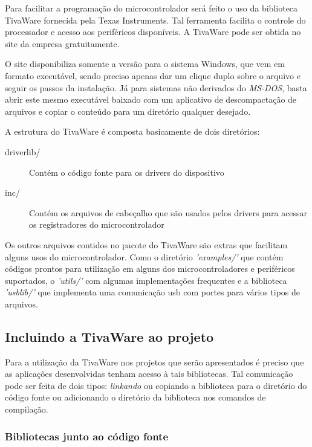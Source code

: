 Para facilitar a programação do microcontrolador será feito o uso da biblioteca TivaWare fornecida pela Texas Instruments. Tal ferramenta facilita o controle do processador e acesso aos periféricos disponíveis. A TivaWare pode ser obtida no site da empresa gratuitamente.

O site disponibiliza somente a versão para o sistema Windows, que vem em formato executável, sendo preciso apenas dar um clique duplo sobre o arquivo e seguir os passos da instalação. Já para sistemas não derivados do \emph{MS-DOS}, basta abrir este mesmo executável baixado com um aplicativo de descompactação de arquivos e copiar o conteúdo para um diretório qualquer desejado.

A estrutura do TivaWare é composta basicamente de dois diretórios:

\begin{description}
	\item [driverlib/] Contém o código fonte para os drivers do dispositivo
	\item [inc/] Contém os arquivos de cabeçalho que são usados pelos drivers para acessar os registradores do microcontrolador
\end{description}

Os outros arquivos contidos no pacote do TivaWare são extras que facilitam alguns usos do microcontrolador. Como o diretório \emph{'examples/'} que contém códigos prontos para utilização em alguns dos microcontroladores e periféricos suportados, o \emph{'utils/'} com algumas implementações frequentes e a biblioteca \emph{'usblib/'} que implementa uma comunicação usb com portes para vários tipos de arquivos.


\subsection{Incluindo a TivaWare  ao projeto}

Para a utilização da TivaWare nos projetos que serão apresentados é preciso que as aplicações desenvolvidas tenham acesso à tais bibliotecas. Tal comunicação pode ser feita de dois tipos: \emph{linkando} ou copiando a biblioteca para o diretório do código fonte ou adicionando o diretório da biblioteca nos comandos de compilação.

\subsubsection{Bibliotecas junto ao código fonte}


